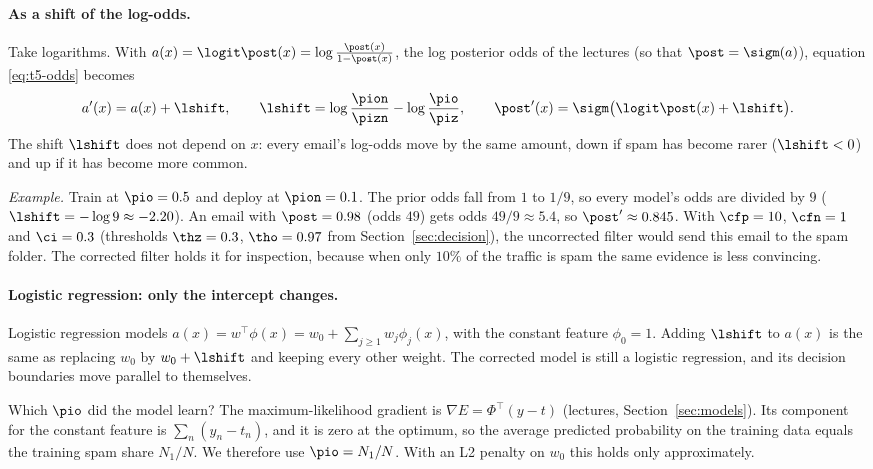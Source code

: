 \paragraph{As a shift of the log-odds.}
Take logarithms. With $a(x) = \logit\post(x) = \log\frac{\post(x)}{1-\post(x)}$, the log posterior odds of
the lectures (so that $\post=\sigm(a)$), equation \eqref{eq:t5-odds} becomes
\begin{equation}
  a'(x) = a(x) + \lshift, \qquad
  \lshift = \log\frac{\pion}{\pizn} - \log\frac{\pio}{\piz}, \qquad
  \post'(x) = \sigm\big(\logit\post(x) + \lshift\big).
  \label{eq:t5-shift}
\end{equation}
The shift $\lshift$ does not depend on $x$: every email's log-odds move by the same amount, down if spam
has become rarer ($\lshift<0$) and up if it has become more common.

\emph{Example.} Train at $\pio=0.5$ and deploy at $\pion=0.1$. The prior odds fall from $1$ to $1/9$, so
every model's odds are divided by $9$ ($\lshift=-\log 9\approx-2.20$). An email with $\post=0.98$ (odds
$49$) gets odds $49/9\approx5.4$, so $\post'\approx0.845$. With $\cfp=10$, $\cfn=1$ and $\ci=0.3$
(thresholds $\thz=0.3$, $\tho=0.97$ from Section~\ref{sec:decision}), the uncorrected filter would send this
email to the spam folder. The corrected filter holds it for inspection, because when only $10\%$ of the
traffic is spam the same evidence is less convincing.

\paragraph{Logistic regression: only the intercept changes.}
Logistic regression models $a(x) = w^\top\phi(x) = w_0 + \sum_{j\ge1} w_j\phi_j(x)$, with the constant
feature $\phi_0=1$. Adding $\lshift$ to $a(x)$ is the same as replacing $w_0$ by $w_0+\lshift$ and keeping
every other weight. The corrected model is still a logistic regression, and its decision boundaries move
parallel to themselves.

Which $\pio$ did the model learn? The maximum-likelihood gradient is $\nabla E = \Phi^\top(y-t)$
(lectures, Section~\ref{sec:models}). Its component for the constant feature is $\sum_n(y_n-t_n)$, and it is
zero at the optimum, so the average predicted probability on the training data equals the training spam
share $N_1/N$. We therefore use $\pio = N_1/N$. With an L2 penalty on $w_0$ this holds only approximately.

